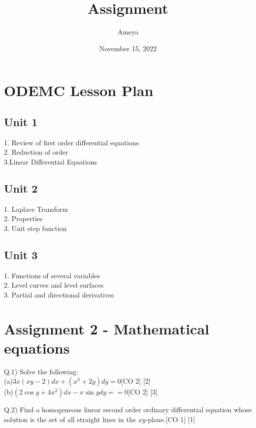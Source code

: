 \documentclass[12pt]{article}
\title{Assignment }
\author{Ameya}
\date{November 15, 2022}
\begin{document}
	\newpage
	\maketitle
	\section{ODEMC Lesson Plan}
	\subsection{Unit 1}
	1. Review of first order differential equations\\
	2. Reduction of order\\
	3.Linear Differential Equations\\
	\subsection{Unit 2}
	1. Laplace Transform\\
	2. Properties\\
	3. Unit step function\\
	\subsection{Unit 3}
	1. Functions of several variables \\
	2. Level curves and level surfaces\\
	3. Partial and directional derivatives\\
	\pagebreak
	
	\section{Assignment 2 - Mathematical equations}
	\begin{flushleft}
		Q.1) Solve the following:\\[10pt]
		(a)$3x(xy-2)dx+(x^3+2y)dy=0$\hspace{5.5cm}[CO 2] [2]\\[6 pt]
		(b)$(2\cos{y} + 4x^2)dx -x\sin{y}dy==0$\hspace{4.65cm}[CO 2]    [3]\\
	\end{flushleft} 
	
	
	
	\begin{flushleft}
		Q.2) Find a homogeneous linear second order ordinary differential equation whose solution is the set of all straight lines in the $xy$-plane.\hspace{1cm}[CO 1] [1]\\ 
	\end{flushleft}
	
\end{document}
